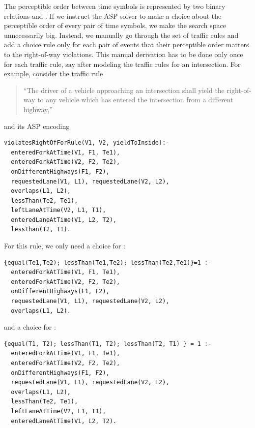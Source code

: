 The perceptible order between time symbols is represented by two binary relations   and .
%
If we instruct the ASP solver to make a choice about the perceptible order of every pair of time symbols, we make the search space unnecessarily big.
%
Instead, we manually go through the set of traffic rules and add a choice rule only for each pair of events that their perceptible order matters to the right-of-way violations.
%
This manual derivation has to be done only once for each traffic rule, say after modeling the traffic rules for an intersection.
%
For example, consider the traffic rule 
\begin{quote}
``The driver of a vehicle approaching an intersection shall yield the right-of-way
to any vehicle which has entered the intersection from a different highway,''    
\end{quote}
and its ASP encoding
\begin{verbatim}
violatesRightOfForRule(V1, V2, yieldToInside):-
  enteredForkAtTime(V1, F1, Te1),
  enteredForkAtTime(V2, F2, Te2),
  onDifferentHighways(F1, F2),
  requestedLane(V1, L1), requestedLane(V2, L2),
  overlaps(L1, L2),
  lessThan(Te2, Te1),
  leftLaneAtTime(V2, L1, T1),
  enteredLaneAtTime(V1, L2, T2),
  lessThan(T2, T1).
\end{verbatim}
%
For this rule, we only need a choice for :
\begin{verbatim}
{equal(Te1,Te2); lessThan(Te1,Te2); lessThan(Te2,Te1)}=1 :- 
  enteredForkAtTime(V1, F1, Te1),
  enteredForkAtTime(V2, F2, Te2),
  onDifferentHighways(F1, F2), 
  requestedLane(V1, L1), requestedLane(V2, L2),
  overlaps(L1, L2).
\end{verbatim}
and a choice for :
\begin{verbatim}
{equal(T1, T2); lessThan(T1, T2); lessThan(T2, T1) } = 1 :-
  enteredForkAtTime(V1, F1, Te1),
  enteredForkAtTime(V2, F2, Te2),
  onDifferentHighways(F1, F2),
  requestedLane(V1, L1), requestedLane(V2, L2),
  overlaps(L1, L2),
  lessThan(Te2, Te1),
  leftLaneAtTime(V2, L1, T1),
  enteredLaneAtTime(V1, L2, T2).
\end{verbatim}

